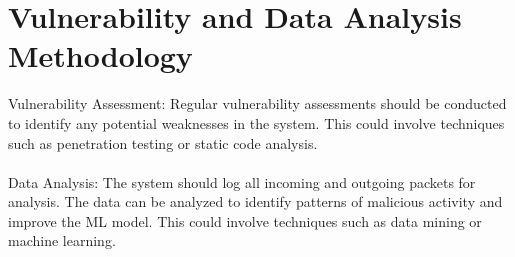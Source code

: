 
\section{Vulnerability and Data Analysis Methodology
}

Vulnerability Assessment: Regular vulnerability assessments should be conducted to identify any potential weaknesses in the system. This could involve techniques such as penetration testing or static code analysis.\\\\

Data Analysis: The system should log all incoming and outgoing packets for analysis. The data can be analyzed to identify patterns of malicious activity and improve the ML model. This could involve techniques such as data mining or machine learning.




